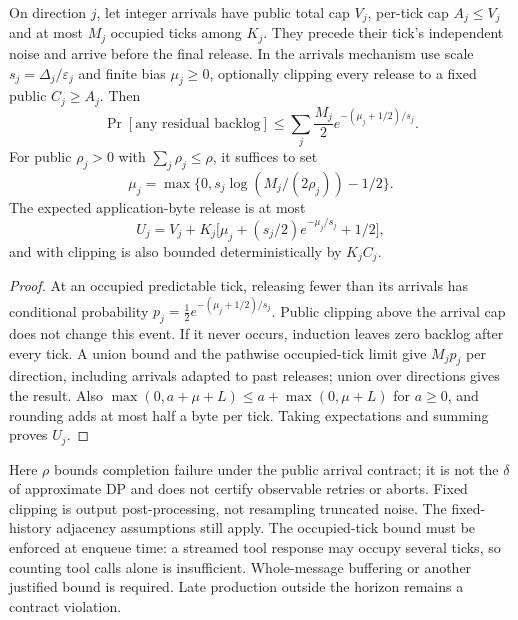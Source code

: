 \begin{proposition}\label{prop:contract}
On direction $j$, let integer arrivals have public total cap $V_j$, per-tick cap $A_j\le V_j$ and at most $M_j$ occupied ticks among $K_j$. They precede their tick's independent noise and arrive before the final release. In the arrivals mechanism use scale $s_j=\Delta_j/\varepsilon_j$ and finite bias $\mu_j\ge0$, optionally clipping every release to a fixed public $C_j\ge A_j$. Then
\[
 \Pr[\text{any residual backlog}]\le\sum_j\frac{M_j}{2}
       e^{-(\mu_j+1/2)/s_j}.
\]
For public $\rho_j>0$ with $\sum_j\rho_j\le\rho$, it suffices to set
\[
 \mu_j=\max\{0,s_j\log(M_j/(2\rho_j))-1/2\}.
\]
The expected application-byte release is at most
\[
 U_j=V_j+K_j\bigl[\mu_j+(s_j/2)e^{-\mu_j/s_j}+1/2\bigr],
\]
and with clipping is also bounded deterministically by $K_jC_j$.
\end{proposition}
\begin{proof}
At an occupied predictable tick, releasing fewer than its arrivals has conditional probability $p_j=\tfrac12 e^{-(\mu_j+1/2)/s_j}$. Public clipping above the arrival cap does not change this event. If it never occurs, induction leaves zero backlog after every tick. A union bound and the pathwise occupied-tick limit give $M_jp_j$ per direction, including arrivals adapted to past releases; union over directions gives the result. Also $\max(0,a+\mu+L)\le a+\max(0,\mu+L)$ for $a\ge0$, and rounding adds at most half a byte per tick. Taking expectations and summing proves $U_j$.
\end{proof}
Here $\rho$ bounds completion failure under the public arrival contract; it is not the $\delta$ of approximate DP and does not certify observable retries or aborts. Fixed clipping is output post-processing, not resampling truncated noise. The fixed-history adjacency assumptions still apply. The occupied-tick bound must be enforced at enqueue time: a streamed tool response may occupy several ticks, so counting tool calls alone is insufficient. Whole-message buffering or another justified bound is required. Late production outside the horizon remains a contract violation.

